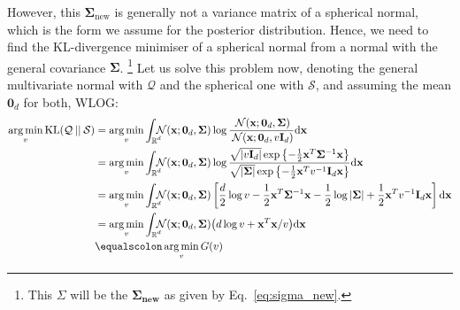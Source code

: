 \documentclass[11pt]{article}
\newcommand{\vek}[1]{\ensuremath{\mathbf{#1}}}
\newcommand{\kve}{\ensuremath{\mathcal{Q}}}
\newcommand{\byd}{\ensuremath{\mathrm{d}}}
\newcommand{\KL}[2]{\ensuremath{\text{KL}(#1\:||\:#2)}}
\newcommand{\norm}{\ensuremath{\:\mathcal{N}}}
\newcommand{\unity}{\ensuremath{\mathbf{I}}}
\newcommand{\real}{\ensuremath{\mathbb{R}}}
\DeclareMathOperator*{\argmin}{arg\,min}
\newcommand{\intrcc}{\ensuremath{\int_{\rlap{\scriptsize$\real^d$}}}}
\begin{document}
However, this $\vek{\Sigma}_{\text{new}}$ is generally not a variance 
matrix of a spherical normal, which is the form we assume for the 
posterior distribution.
Hence, we need to find the KL-divergence minimiser of a spherical normal 
from a normal with the general covariance $\vek{\Sigma}$.%
\footnote{This $\Sigma$ will be the $\vek{\Sigma_{\text{new}}}$ as given by 
Eq.~\eqref{eq:sigma_new}.} %
Let us solve this problem now, denoting the general multivariate normal 
with $\kve$ and the spherical one with $\mathcal{S}$, and assuming the mean 
$\vek{0}_d$ for both, WLOG:
\begin{align}
	\argmin_v \KL{\kve}{\mathcal{S}} &= %
	\argmin_v \intrcc
		\norm(\vek{x}; \vek{0}_d, \vek{\Sigma})
		\log \frac{\norm(\vek{x}; \vek{0}_d, \vek{\Sigma})}
							{\norm(\vek{x}; \vek{0}_d, v\unity_d)}  \byd \vek{x} \\
	&= \argmin_v \intrcc
		\norm(\vek{x}; \vek{0}_d, \vek{\Sigma})
		\log\frac{\sqrt{|v\unity_d|}\exp\left\{-\frac{1}{2}\vek{x}^T\vek{\Sigma}^{-1}\vek{x}\right\}}
		         {\sqrt{|\vek{\Sigma}|}\exp\left\{-\frac{1}{2}\vek{x}^T v^{-1}\unity_d \vek{x}\right\}}
						 \byd \vek{x} \\
	&= \argmin_v \intrcc
		\norm(\vek{x}; \vek{0}_d, \vek{\Sigma})
	\left[\frac{d}{2}\log v - \frac{1}{2}\vek{x}^T\vek{\Sigma}^{-1}\vek{x}
				- \frac{1}{2}\log|\vek{\Sigma}| + \frac{1}{2}\vek{x}^Tv^{-1}\unity_d \vek{x}
	\right]\byd \vek{x} \\
	&= \argmin_v \intrcc
		\norm(\vek{x}; \vek{0}_d, \vek{\Sigma})
		\big(d\log v + \vek{x}^T\vek{x}/v\big)\byd \vek{x} \\
	&\equalscolon \argmin_v G(v)
\end{align}
\end{document}
